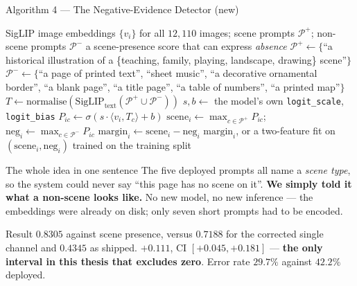 \documentclass[aspectratio=169,11pt]{beamer}
\begin{document}
\begin{frame}{Algorithm 4 --- The Negative-Evidence Detector (new)}
\tiny
\begin{algorithmic}[1]
\Require SigLIP image embeddings $\{v_i\}$ for all $12{,}110$ images; scene prompts $\mathcal{P}^{+}$; non-scene prompts $\mathcal{P}^{-}$
\Ensure a scene-presence score that can express \emph{absence}
\State $\mathcal{P}^{+} \leftarrow \{$``a historical illustration of a \{teaching, family, playing, landscape, drawing\} scene''$\}$
\State $\mathcal{P}^{-} \leftarrow \{$``a page of printed text'', ``sheet music'', ``a decorative ornamental border'', ``a blank page'', ``a title page'', ``a table of numbers'', ``a printed map''$\}$
\State $T \leftarrow \text{normalise}(\text{SigLIP}_{\text{text}}(\mathcal{P}^{+} \cup \mathcal{P}^{-}))$
\State $s, b \leftarrow$ the model's own \texttt{logit\_scale}, \texttt{logit\_bias} 
\State $P_{ic} \leftarrow \sigma\!\left(s \cdot \langle v_i, T_c\rangle + b\right)$ 
\State $\text{scene}_i \leftarrow \max_{c \in \mathcal{P}^{+}} P_{ic}$; \quad $\text{neg}_i \leftarrow \max_{c \in \mathcal{P}^{-}} P_{ic}$
\State $\text{margin}_i \leftarrow \text{scene}_i - \text{neg}_i$
\State \Return $\text{margin}_i$, or a two-feature fit on $(\text{scene}_i, \text{neg}_i)$ trained on the training split
\end{algorithmic}
\vspace{1mm}
\begin{exampleblock}{\scriptsize The whole idea in one sentence}
\scriptsize The five deployed prompts all name a \emph{scene type}, so the system could never say ``this page has no scene on it''. \textbf{We simply told it what a non-scene looks like.} No new model, no new inference --- the embeddings were already on disk; only seven short prompts had to be encoded.
\end{exampleblock}
\vspace{-1mm}
\begin{alertblock}{\scriptsize Result}
\scriptsize $\mathbf{0.8305}$ against scene presence, versus $0.7188$ for the corrected single channel and $0.4345$ as shipped. $+0.111$, CI $[+0.045,+0.181]$ --- \textbf{the only interval in this thesis that excludes zero}. Error rate $\mathbf{29.7\%}$ against $42.2\%$ deployed.
\end{alertblock}
\end{frame}
\end{document}
